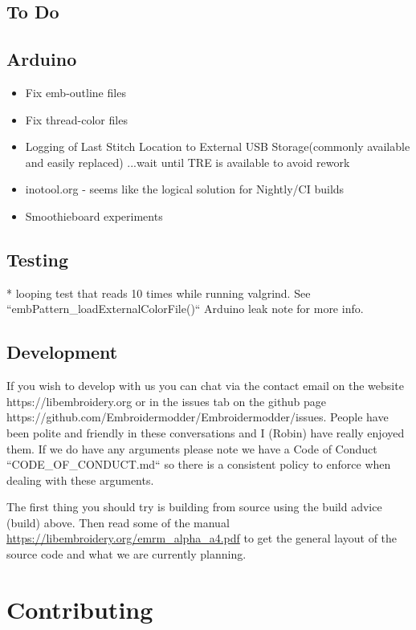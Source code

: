 \documentclass[11pt]{report}
\begin{document}
\subsection{To Do}

\subsection{Arduino}

\begin{itemize}
\item Fix emb-outline files
\item Fix thread-color files
\item Logging of Last Stitch Location to External USB Storage(commonly available and easily replaced) ...wait until TRE is available to avoid rework
\item inotool.org - seems like the logical solution for Nightly/CI builds
\item Smoothieboard experiments
\end{itemize}

\subsection{Testing}

* looping test that reads 10 times while running valgrind. See ``embPattern\_loadExternalColorFile()`` Arduino leak note for more info.

\subsection{Development}

If you wish to develop with us you can chat via the contact email
on the website https://libembroidery.org or in the issues tab on the
github page https://github.com/Embroidermodder/Embroidermodder/issues.
People have been polite and friendly in these conversations and I (Robin)
have really enjoyed them.
If we do have any arguments please note we have a
Code of Conduct ``CODE\_OF\_CONDUCT.md`` so there is a consistent policy to
enforce when dealing with these arguments.

The first thing you should try is building from source using the  build advice (build)
above. Then read some of the  manual
\url{https://libembroidery.org/emrm_alpha_a4.pdf} to get the general
layout of the source code and what we are currently planning.

\section{Contributing}
\end{document}
